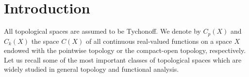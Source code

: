 \documentclass[preprint,11pt]{elsarticle}
\numberwithin{equation}{section}
\numberwithin{theorem}{section}
\newcommand{\CC}{C_k}
\begin{document}

\section{Introduction}


All topological spaces are assumed to be Tychonoff. We denote by $C_p(X)$ and $\CC(X)$ the space $C(X)$ of all continuous real-valued functions on a space $X$ endowed with the pointwise topology or the compact-open topology, respectively. Let us recall some of the most important classes of topological spaces which are widely studied in general topology and functional analysis.
\end{document}
